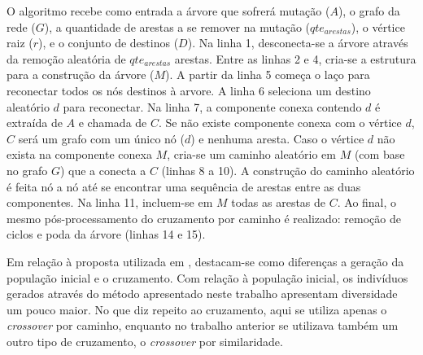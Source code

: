 O algoritmo recebe como entrada a árvore que sofrerá mutação ($A$), o grafo da rede ($G$), a quantidade de arestas a se remover na mutação ($qte_{arestas}$), o vértice raiz ($r$), e o conjunto de destinos ($D$). Na linha 1, desconecta-se a árvore através da remoção aleatória de $qte_{arestas}$ arestas. Entre as linhas 2 e 4, cria-se a estrutura para a construção da árvore ($M$). A partir da linha 5 começa o laço para reconectar todos os nós destinos à arvore. A linha 6 seleciona um destino aleatório $d$ para reconectar. Na linha 7, a componente conexa contendo $d$ é extraída de $A$ e chamada de $C$. Se não existe componente conexa com o vértice $d$, $C$ será um grafo com um único nó ($d$) e nenhuma aresta. Caso o vértice $d$ não exista na componente conexa $M$, cria-se um caminho aleatório em $M$ (com base no grafo $G$) que a conecta a $C$ (linhas 8 a 10). A construção do caminho aleatório é feita nó a nó até se encontrar uma sequência de arestas entre as duas componentes. Na linha 11, incluem-se em $M$ todas as arestas de $C$. Ao final, o mesmo pós-processamento do cruzamento por caminho é realizado: remoção de ciclos e poda da árvore (linhas 14 e 15).

Em relação à proposta utilizada em \cite{LafetaThesis}, destacam-se como diferenças a geração da população inicial e o cruzamento. Com relação à população inicial, os indivíduos gerados através do método apresentado neste trabalho apresentam diversidade um pouco maior. No que diz repeito ao cruzamento, aqui se utiliza apenas o \textit{crossover} por caminho, enquanto no trabalho anterior se utilizava também um outro tipo de cruzamento, o \textit{crossover} por similaridade.